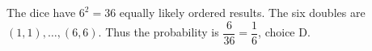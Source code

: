 The dice have $6^2=36$ equally likely ordered results. The six doubles are $(1,1),\ldots,(6,6)$. Thus the probability is $\dfrac{6}{36}=\boxed{\dfrac{1}{6}}$, choice D.

